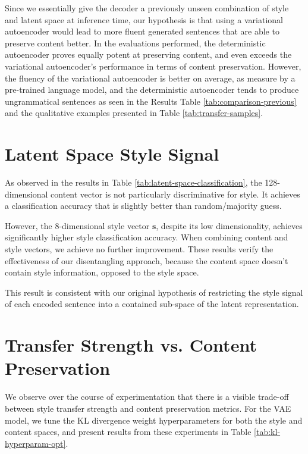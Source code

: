 Since we essentially give the decoder a previously unseen combination of style and latent space at inference time, our hypothesis is that using a variational autoencoder would lead to more fluent generated sentences that are able to preserve content better. In the evaluations performed, the deterministic autoencoder proves equally potent at preserving content, and even exceeds the variational autoencoder's performance in terms of content preservation. However, the fluency of the variational autoencoder is better on average, as measure by a pre-trained language model, and the deterministic autoencoder tends to produce ungrammatical sentences as seen in the Results Table \ref{tab:comparison-previous} and the qualitative examples presented in Table \ref{tab:transfer-samples}.


\section{Latent Space Style Signal}

As observed in the results in Table \ref{tab:latent-space-classification}, the 128-dimensional content vector is not particularly discriminative for style. It achieves a classification accuracy that is slightly better than random/majority guess.

However, the 8-dimensional style vector $\bm s$, despite its low dimensionality, achieves significantly higher style classification accuracy. When combining content and style vectors, we achieve no further improvement. These results verify the effectiveness of our disentangling approach, because the content space doesn't contain style information, opposed to the style space.

This result is consistent with our original hypothesis of restricting the style signal of each encoded sentence into a contained sub-space of the latent representation.


\section{Transfer Strength vs. Content Preservation}

We observe over the course of experimentation that there is a visible trade-off between style transfer strength and content preservation metrics. For the VAE model, we tune the KL divergence weight hyperparameters for both the style and content spaces, and present results from these experiments in Table \ref{tab:kl-hyperparam-opt}.

